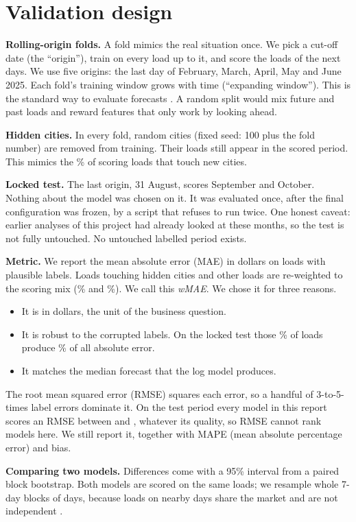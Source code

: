 \section{Validation design}\label{sec:validation}

\textbf{Rolling-origin folds.} A fold mimics the real situation once. We pick a cut-off date (the ``origin''),
train on every load up to it, and score the loads of the next \HorizonDays{} days. We use five origins: the last day of
February, March, April, May and June 2025. Each fold's training window grows with time (``expanding window'').
This is the standard way to evaluate forecasts \citep{hyndman2021fpp3}. A random split would mix future and past
loads and reward features that only work by looking ahead.

\textbf{Hidden cities.} In every fold, \HiddenCitiesPerFold{} random cities (fixed seed: 100 plus the fold number) are removed from
training. Their loads still appear in the scored period. This mimics the \UnseenShare\% of scoring loads that touch
new cities.

\textbf{Locked test.} The last origin, 31 August, scores September and October. Nothing about the model was chosen
on it. It was evaluated once, after the final configuration was frozen, by a script that refuses to run twice.
One honest caveat: earlier analyses of this project had already looked at these months, so the test is not fully
untouched. No untouched labelled period exists.

\textbf{Metric.} We report the mean absolute error (MAE) in dollars on loads with plausible labels. Loads touching
hidden cities and other loads are re-weighted to the scoring mix (\UnseenWeight\% and \SeenWeight\%). We call this
\emph{wMAE}. We chose it for three reasons.
\begin{itemize}
  \item It is in dollars, the unit of the business question.
  \item It is robust to the corrupted labels. On the locked test those \CorruptPct\% of loads produce
        \CorruptShareOfError\% of all absolute error.
  \item It matches the median forecast that the log model produces.
\end{itemize}
The root mean squared error (RMSE) squares each error, so a handful of 3-to-5-times label errors dominate it. On the test period
every model in this report scores an RMSE between \usd{\RmseTestMin} and \usd{\RmseTestMax}, whatever its quality, so
RMSE cannot rank models here. We still report it, together with MAPE (mean absolute percentage error) and bias.

\textbf{Comparing two models.} Differences come with a 95\% interval from a paired block bootstrap. Both models are
scored on the same loads; we resample whole 7-day blocks of days, because loads on nearby days share the market
and are not independent \citep{kunsch1989jackknife}.
